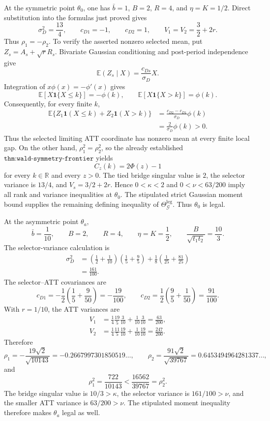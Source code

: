 At the symmetric point \(\theta_0\), one has \(\bar b=1\), \(B=2\), \(R=4\), and \(\eta=K=1/2\).  Direct substitution into the formulas just proved gives
\[
 \sigma_D^2=\frac{13}{4},
 \qquad
 c_{D1}=-1,
 \qquad
 c_{D2}=1,
 \qquad
 V_1=V_2=\frac32+2r.
\]
Thus \(\rho_1=-\rho_2\).  To verify the asserted nonzero selected mean, put \(Z_s=A_s+\sqrt rR_s\).  Bivariate Gaussian conditioning and post-period independence give
\[
 \mathbb E(Z_s\mid X)=\frac{c_{Ds}}{\sigma_D}X.
\]
Integration of \(x\phi(x)=-\phi'(x)\) gives
\[
 \mathbb E[X\mathbf 1\{X\leq k\}]=-\phi(k),
 \qquad
 \mathbb E[X\mathbf 1\{X>k\}]=\phi(k).
\]
Consequently, for every finite \(k\),
\[
 \begin{aligned}
 \mathbb E\{Z_1\mathbf 1(X\leq k)+Z_2\mathbf 1(X>k)\}
 &=\frac{c_{D2}-c_{D1}}{\sigma_D}\phi(k)\\
 &=\frac2{\sigma_D}\phi(k)>0.
 \end{aligned}
\]
Thus the selected limiting ATT coordinate has nonzero mean at every finite local gap.  On the other hand, \(\rho_1^2=\rho_2^2\), so the already established \(\texttt{thm:wald-symmetry-frontier}\) yields
\[
 C_z(k)=2\Phi(z)-1
\]
for every \(k\in\mathbb R\) and every \(z>0\).  The tied bridge singular value is \(2\), the selector variance is \(13/4\), and \(V_s=3/2+2r\).  Hence \(0<\kappa<2\) and \(0<\nu<63/200\) imply all rank and variance inequalities at \(\theta_0\).  The stipulated strict Gaussian moment bound supplies the remaining defining inequality of \(\Theta_{\mathcal G}^{\mathrm{leg}}\).  Thus \(\theta_0\) is legal.

At the asymmetric point \(\theta_a\),
\[
 \bar b=\frac1{10},
 \qquad
 B=2,
 \qquad
 R=4,
 \qquad
 \eta=K=\frac12,
 \qquad
 \frac{B}{\sqrt{t_1t_2}}=\frac{10}{3}.
\]
The selector-variance calculation is
\[
 \begin{aligned}
 \sigma_D^2
 &=\left(\frac12+\frac1{10}\right)
   \left(\frac15+\frac95\right)
   +\frac18\left(\frac1{25}+\frac{81}{25}\right)\\
 &=\frac{161}{100}.
 \end{aligned}
\]
The selector--ATT covariances are
\[
 c_{D1}=-\frac12\left(\frac15+\frac9{50}\right)=-\frac{19}{100},
 \qquad
 c_{D2}=\frac12\left(\frac95+\frac1{50}\right)=\frac{91}{100}.
\]
With \(r=1/10\), the ATT variances are
\[
 \begin{aligned}
 V_1
 &=\frac14\frac{19}{5}\frac3{10}+\frac1{10}\frac3{10}
 =\frac{63}{200},\\
 V_2
 &=\frac14\frac{11}{5}\frac{19}{10}+\frac1{10}\frac{19}{10}
 =\frac{247}{200}.
 \end{aligned}
\]
Therefore
\[
 \rho_1=-\frac{19\sqrt2}{\sqrt{10143}}
 =-0.2667997301850519\ldots,
 \qquad
 \rho_2=\frac{91\sqrt2}{\sqrt{39767}}
 =0.6453494964281337\ldots,
\]
and
\[
 \rho_1^2=\frac{722}{10143}
 <\frac{16562}{39767}=\rho_2^2.
\]
The bridge singular value is \(10/3>\kappa\), the selector variance is \(161/100>\nu\), and the smaller ATT variance is \(63/200>\nu\).  The stipulated moment inequality therefore makes \(\theta_a\) legal as well.

